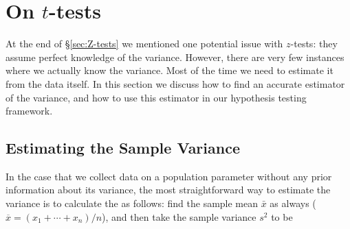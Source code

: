 
\section{On $t$-tests} \label{sec:T-tests}



At the end of \S\ref{sec:Z-tests} we mentioned one potential issue with $z$-tests: they assume perfect knowledge of the variance. However, there are very few instances where we actually know the variance. Most of the time we need to estimate it from the data itself. In this section we discuss how to find an accurate estimator of the variance, and how to use this estimator in our hypothesis testing framework.














\subsection{Estimating the Sample Variance}



In the case that we collect data on a population parameter without any prior information about its variance, the most straightforward way to estimate the variance is to calculate the  as follows: find the sample mean $\bar{x}$ as always ($\overline{x} = (x_1+\cdots+x_n)/n$), and then take the sample variance $s^2$ to be

